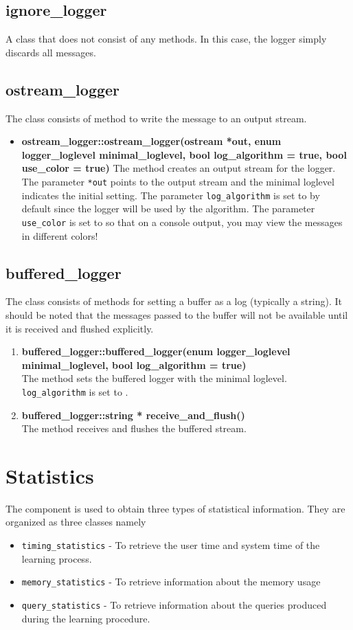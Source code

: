 \subsection*{ignore\_logger}
A class that does not consist of any methods. In this case, the logger simply discards all messages.

\subsection*{ostream\_logger}
The class consists of method to write the message to an output stream. 
\begin{itemize}
 \item \textbf{ostream\_logger::ostream\_logger(ostream *out, enum logger\_loglevel minimal\_loglevel, bool log\_algorithm = true, bool use\_color = true)} \vskip 1pt
	The method creates an output stream for the logger. The parameter \texttt{*out} points to the output stream and the minimal loglevel indicates the initial setting. The parameter \texttt{log\_algorithm} is set to \true by default since the logger will be used by the algorithm. The parameter \texttt{use\_color} is set to \true so that on a console output, you may view the messages in different colors!
\end{itemize}

\subsection*{buffered\_logger}
The class consists of methods for setting a buffer as a log (typically a string). It should be noted that the messages passed to the buffer will not be available until it is received and flushed explicitly.

\begin{enumerate}
 \item \textbf{buffered\_logger::buffered\_logger(enum logger\_loglevel minimal\_loglevel, bool log\_algorithm = true)} \\
	The method sets the buffered logger with the minimal loglevel. \texttt{log\_algorithm} is set to \true.
 \item \textbf{buffered\_logger::string * receive\_and\_flush()} \\
	The method receives and flushes the buffered stream.
\end{enumerate}

\section{Statistics}
The component is used to obtain three types of statistical information. They are organized as three classes namely 
\begin{itemize}
\item \texttt{timing\_statistics} - To retrieve the user time and system time of the learning process.
\item \texttt{memory\_statistics} - To retrieve information about the memory usage
\item \texttt{query\_statistics} - To retrieve information about the queries produced during the learning procedure.
\end{itemize}

